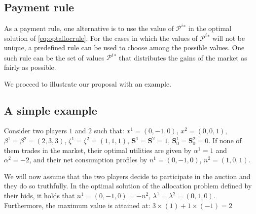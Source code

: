 \documentclass[runningheads]{llncs}
\newcommand{\li}[1][]{x^i_{#1}}
\newcommand{\oi}[1][]{n^i_{#1}}
\newcommand{\bai}[1][]{s^i_{#1}}
\newcommand{\pbi}[1][]{\beta^i_{#1}}
\newcommand{\pzi}[1][]{\zeta^i_{#1}}
\newcommand{\storagei}{\mathbf{S}^i}
\newcommand{\guari}{\alpha^i}
\newcommand{\pri}[1][]{\lambda^i_{#1}}
\newcommand{\gaini}[1][]{\mathcal{P}^i_{#1}}
\begin{document}
\subsection{Payment rule}

As a payment rule, one alternative is to use the value of $\gaini^*$ in the optimal solution of \eqref{eq:optallocrule}. For the cases in which the values of $\gaini^*$ will not be unique, a predefined rule can be used to choose among the possible values. One such rule can be the set of values $\gaini^*$ that distributes the gains of the market as fairly as possible.

We proceed to illustrate our proposal with an example.


\subsection{A simple example}
Consider two players $1$ and $2$ such that: $x^1 = (0, -1, 0)$, $x^2 = (0, 0, 1)$, $\beta^1 = \beta^2 = (2, 3, 3)$, $\zeta^1 = \zeta^2 = (1, 1, 1)$, $\mathbf{S}^1 = \mathbf{S}^2 = 1$, $\mathbf{S}^1_0 = \mathbf{S}^2_0 = 0$. If none of them trades in the market, their optimal utilities are given by $\alpha^1 = 1$ and $\alpha^2 = -2$, and their net consumption profiles by $n^1 = (0, -1, 0)$, $n^2=(1, 0, 1)$. 


We will now assume that the two players decide to participate in the auction and they do so truthfully. In the optimal solution of the allocation problem defined by their bids, it holds that $n^1 = (0, -1, 0) = - n^2$, $\lambda^1 = \lambda^2 = (0, 1, 0)$. Furthermore, the maximum value is attained at: $3\times (1)  + 1 \times (-1) = 2$
\end{document}
